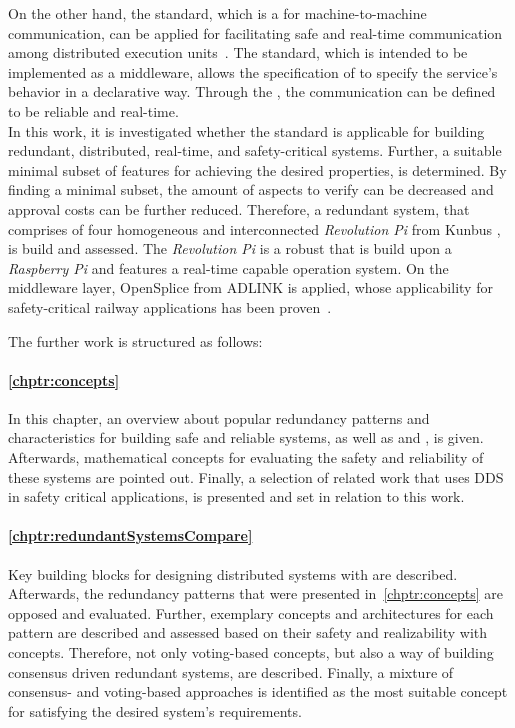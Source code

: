 On the other hand, the  standard, which is a  for machine-to-machine communication, can be applied for facilitating safe and real-time communication among distributed execution units~\cite{DistributedSafety2020}.
The standard, which is intended to be implemented as a middleware, allows the specification of  to specify the service's behavior in a declarative way.
Through the , the communication can be defined to be reliable and real-time.
\\

In this work, it is investigated whether the  standard is applicable for building redundant, distributed, real-time, and safety-critical systems.
Further, a suitable minimal subset of  features for achieving the desired properties, is determined.
By finding a minimal subset, the amount of aspects to verify can be decreased and approval costs can be further reduced.
Therefore, a redundant system, that comprises of four homogeneous and interconnected \textit{Revolution Pi} from Kunbus , is build and assessed.
The \textit{Revolution Pi} is a robust  that is build upon a \textit{Raspberry Pi} and features a real-time capable operation system.
On the middleware layer, OpenSplice  from ADLINK  is applied, whose applicability for safety-critical railway applications has been proven~\cite{SchmidtMissionCriticalChallenges}.

The further work is structured as follows:

\paragraph{\autoref{chptr:concepts}}
In this chapter, an overview about popular redundancy patterns and characteristics for building safe and reliable systems, as well as  and , is given.
Afterwards, mathematical concepts for evaluating the safety and reliability of these systems are pointed out.
Finally, a selection of related work that uses \gls{DDS} in safety critical applications, is presented and set in relation to this work.

\paragraph{\autoref{chptr:redundantSystemsCompare}}
Key building blocks for designing distributed systems with  are described.
Afterwards, the redundancy patterns that were presented in~\autoref{chptr:concepts} are opposed and evaluated.
Further, exemplary concepts and architectures for each pattern are described and assessed based on their safety and realizability with  concepts.
Therefore, not only voting-based concepts, but also a way of building consensus driven redundant systems, are described.
Finally, a mixture of consensus- and voting-based approaches is identified as the most suitable concept for satisfying the desired system's requirements.

